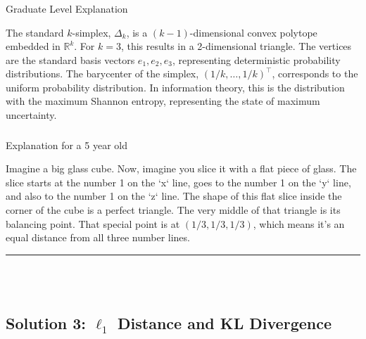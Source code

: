 \documentclass{article}
\begin{document}
\subsubsection*{\normalfont}{Graduate Level Explanation}\\
\parbox{\textwidth}{The standard $k$-simplex, $\Delta_k$, is a $(k-1)$-dimensional convex polytope embedded in $\mathbb{R}^k$. For $k=3$, this results in a 2-dimensional triangle. The vertices are the standard basis vectors $e_1, e_2, e_3$, representing deterministic probability distributions. The barycenter of the simplex, $(1/k, \dots, 1/k)^\top$, corresponds to the uniform probability distribution. In information theory, this is the distribution with the maximum Shannon entropy, representing the state of maximum uncertainty.}

\subsubsection*{\normalfont}{Explanation for a 5 year old}\\
\parbox{\textwidth}{Imagine a big glass cube. Now, imagine you slice it with a flat piece of glass. The slice starts at the number 1 on the `x` line, goes to the number 1 on the `y` line, and also to the number 1 on the `z` line. The shape of this flat slice inside the corner of the cube is a perfect triangle. The very middle of that triangle is its balancing point. That special point is at $(1/3, 1/3, 1/3)$, which means it's an equal distance from all three number lines.}

\noindent\rule{\textwidth}{0.4pt}\\\\

\subsection*{Solution 3: $\ell_1$ Distance and KL Divergence}
\end{document}
